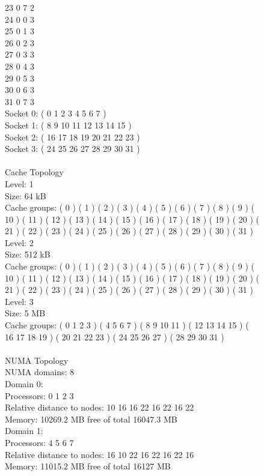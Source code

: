 \documentclass[12pt]{article}
\begin{document}
\begin{figure}[ht]
\begin{tt}
23		0		7		2\\
24		0		0		3\\
25		0		1		3\\
26		0		2		3\\
27		0		3		3\\
28		0		4		3\\
29		0		5		3\\
30		0		6		3\\
31		0		7		3\\
Socket 0: ( 0 1 2 3 4 5 6 7 )\\
Socket 1: ( 8 9 10 11 12 13 14 15 )\\
Socket 2: ( 16 17 18 19 20 21 22 23 )\\
Socket 3: ( 24 25 26 27 28 29 30 31 )\\
\\
Cache Topology\\
Level:	1\\
Size:	64 kB\\
Cache groups:	( 0 ) ( 1 ) ( 2 ) ( 3 ) ( 4 ) ( 5 ) ( 6 ) ( 7 ) ( 8 ) ( 9 ) ( 10 ) ( 11 ) ( 12 ) ( 13 ) ( 14 ) ( 15 ) ( 16 ) ( 17 ) ( 18 ) ( 19 ) ( 20 ) ( 21 ) ( 22 ) ( 23 ) ( 24 ) ( 25 ) ( 26 ) ( 27 ) ( 28 ) ( 29 ) ( 30 ) ( 31 )\\
Level:	2\\
Size:	512 kB\\
Cache groups:	( 0 ) ( 1 ) ( 2 ) ( 3 ) ( 4 ) ( 5 ) ( 6 ) ( 7 ) ( 8 ) ( 9 ) ( 10 ) ( 11 ) ( 12 ) ( 13 ) ( 14 ) ( 15 ) ( 16 ) ( 17 ) ( 18 ) ( 19 ) ( 20 ) ( 21 ) ( 22 ) ( 23 ) ( 24 ) ( 25 ) ( 26 ) ( 27 ) ( 28 ) ( 29 ) ( 30 ) ( 31 )\\
Level:	3\\
Size:	5 MB\\
Cache groups:	( 0 1 2 3 ) ( 4 5 6 7 ) ( 8 9 10 11 ) ( 12 13 14 15 ) ( 16 17 18 19 ) ( 20 21 22 23 ) ( 24 25 26 27 ) ( 28 29 30 31 )\\
\\
NUMA Topology\\
NUMA domains: 8 \\
Domain 0:\\
Processors:  0 1 2 3\\
Relative distance to nodes:  10 16 16 22 16 22 16 22\\
Memory: 10269.2 MB free of total 16047.3 MB\\
Domain 1:\\
Processors:  4 5 6 7\\
Relative distance to nodes:  16 10 22 16 22 16 22 16\\
Memory: 11015.2 MB free of total 16127 MB\\

\end{tt}
\end{figure}
\end{document}
